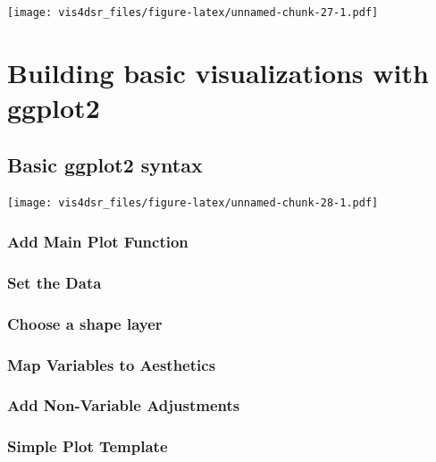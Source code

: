 \documentclass[
]{krantz}
\begin{document}
\texttt{[image: vis4dsr\_files/figure-latex/unnamed-chunk-27-1.pdf]}

\hypertarget{building-basic-visualizations}{%
\chapter{Building basic visualizations with ggplot2}\label{building-basic-visualizations}}

\hypertarget{basic-ggplot2-syntax}{%
\section{Basic ggplot2 syntax}\label{basic-ggplot2-syntax}}

\texttt{[image: vis4dsr\_files/figure-latex/unnamed-chunk-28-1.pdf]}

\hypertarget{add-main-plot-function}{%
\subsection{Add Main Plot Function}\label{add-main-plot-function}}

\hypertarget{set-the-data}{%
\subsection{Set the Data}\label{set-the-data}}

\hypertarget{choose-a-shape-layer}{%
\subsection{Choose a shape layer}\label{choose-a-shape-layer}}

\hypertarget{map-variables-to-aesthetics}{%
\subsection{Map Variables to Aesthetics}\label{map-variables-to-aesthetics}}

\hypertarget{add-non-variable-adjustments}{%
\subsection{Add Non-Variable Adjustments}\label{add-non-variable-adjustments}}

\hypertarget{simple-plot-template}{%
\subsection{Simple Plot Template}\label{simple-plot-template}}
\end{document}
